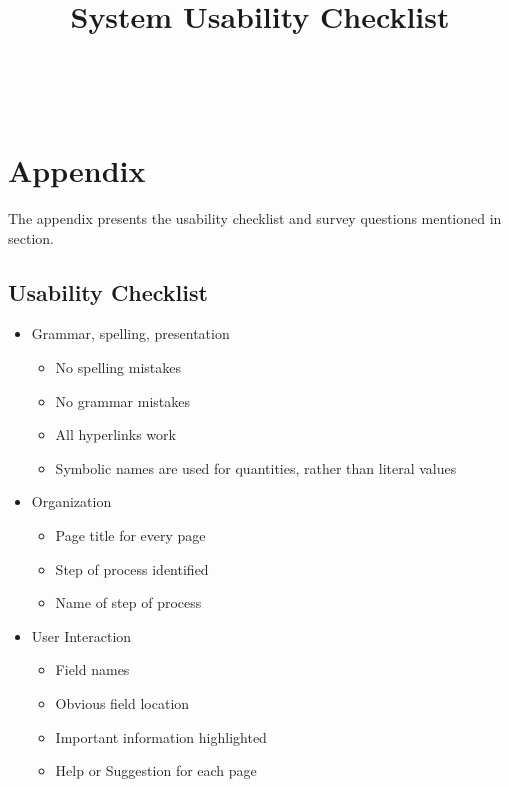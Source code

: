 \documentclass[12pt, titlepage]{article}
\begin{document}
\begin{enumerate}
\begin{enumerate}



~\newpage

\newpage

\section{Appendix}

The appendix presents the usability checklist and survey questions mentioned in 
section.

\subsection{Usability Checklist}


\title{System Usability Checklist}


\begin{itemize}
  
\item Grammar, spelling, presentation
  \begin{itemize}
  \item No spelling mistakes 
  \item No grammar mistakes
  \item All hyperlinks work
  \item Symbolic names are used for quantities, rather than literal values
  \end{itemize}

\item Organization
  \begin{itemize}
  \item Page title for every page
  \item Step of process identified
  \item Name of step of process
  \end{itemize}
  
\item User Interaction
  \begin{itemize}
  \item Field names 
  \item Obvious field location 
  \item Important information highlighted
  \item Help or Suggestion for each page
  \end{itemize}
\end{itemize}



\end{enumerate}
\end{enumerate}
\end{document}
